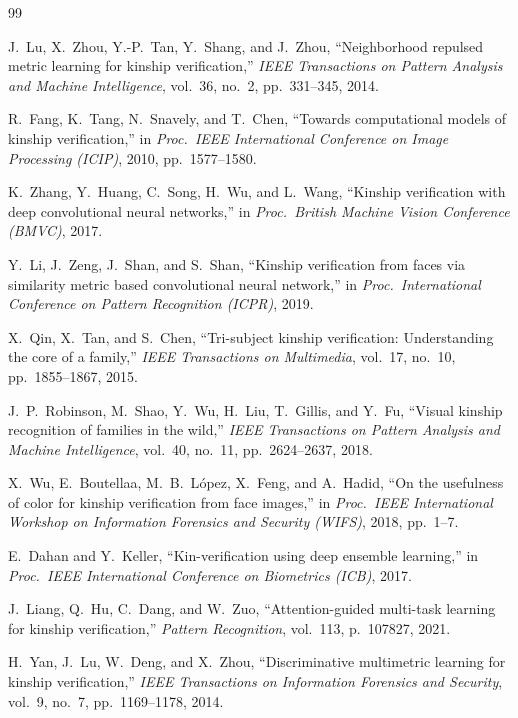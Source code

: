 \documentclass[journal,12pt]{IEEEtran}
\begin{document}
\begin{thebibliography}{99}

J.~Lu, X.~Zhou, Y.-P.~Tan, Y.~Shang, and J.~Zhou,
``Neighborhood repulsed metric learning for kinship verification,''
\textit{IEEE Transactions on Pattern Analysis and Machine Intelligence},
vol.~36, no.~2, pp.~331--345, 2014.

R.~Fang, K.~Tang, N.~Snavely, and T.~Chen,
``Towards computational models of kinship verification,''
in \textit{Proc.\ IEEE International Conference on Image Processing (ICIP)},
2010, pp.~1577--1580.

K.~Zhang, Y.~Huang, C.~Song, H.~Wu, and L.~Wang,
``Kinship verification with deep convolutional neural networks,''
in \textit{Proc.\ British Machine Vision Conference (BMVC)},
2017.

Y.~Li, J.~Zeng, J.~Shan, and S.~Shan,
``Kinship verification from faces via similarity metric based convolutional neural network,''
in \textit{Proc.\ International Conference on Pattern Recognition (ICPR)},
2019.

X.~Qin, X.~Tan, and S.~Chen,
``Tri-subject kinship verification: Understanding the core of a family,''
\textit{IEEE Transactions on Multimedia},
vol.~17, no.~10, pp.~1855--1867, 2015.

J.~P.~Robinson, M.~Shao, Y.~Wu, H.~Liu, T.~Gillis, and Y.~Fu,
``Visual kinship recognition of families in the wild,''
\textit{IEEE Transactions on Pattern Analysis and Machine Intelligence},
vol.~40, no.~11, pp.~2624--2637, 2018.

X.~Wu, E.~Boutellaa, M.~B.~L{\'o}pez, X.~Feng, and A.~Hadid,
``On the usefulness of color for kinship verification from face images,''
in \textit{Proc.\ IEEE International Workshop on Information Forensics
and Security (WIFS)}, 2018, pp.~1--7.

E.~Dahan and Y.~Keller,
``Kin-verification using deep ensemble learning,''
in \textit{Proc.\ IEEE International Conference on Biometrics (ICB)},
2017.

J.~Liang, Q.~Hu, C.~Dang, and W.~Zuo,
``Attention-guided multi-task learning for kinship verification,''
\textit{Pattern Recognition}, vol.~113, p.~107827, 2021.

H.~Yan, J.~Lu, W.~Deng, and X.~Zhou,
``Discriminative multimetric learning for kinship verification,''
\textit{IEEE Transactions on Information Forensics and Security},
vol.~9, no.~7, pp.~1169--1178, 2014.


\end{thebibliography}
\end{document}
